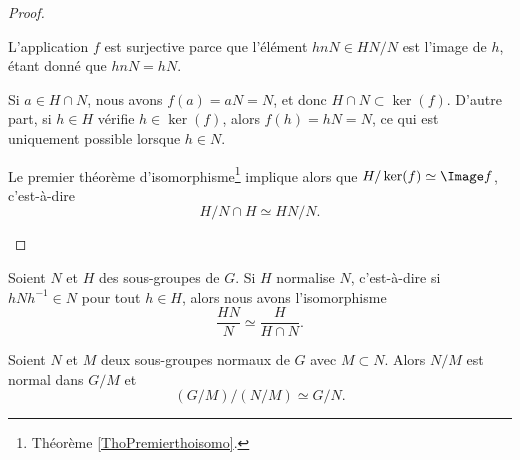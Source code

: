 \begin{proof}
\begin{enumerate}
		      \begin{subproof}
			      L'application \( f\) est surjective parce que l'élément \( hnN\in HN/N\) est l'image de \( h\), étant donné que \( hnN=hN\).

			      \spitem[\( \ker(f) = H\cap N\)]
			      Si \( a\in H\cap N\), nous avons \( f(a) =aN = N\), et donc \( H\cap N\subset \ker(f)\). D'autre part, si \( h\in H\) vérifie \( h\in\ker(f)\), alors \( f(h)=hN=N\), ce qui est uniquement possible lorsque \( h\in N\).

		      \end{subproof}
		      Le premier théorème d'isomorphisme\footnote{Théorème \ref{ThoPremierthoisomo}.} implique alors que \( H/\ker(f)\simeq \Image f\), c'est-à-dire
		      \begin{equation}
			      H/N\cap H\simeq HN/N.
		      \end{equation}
	\end{enumerate}
\end{proof}

\begin{proposition}     \label{PROPooVBGMooPTlyLF}
	Soient \( N\) et \( H\) des sous-groupes de \( G\). Si \( H\) normalise \( N\), c'est-à-dire si \( hNh^{-1}\in N\) pour tout \( h\in H\), alors nous avons l'isomorphisme
	\begin{equation}
		\frac{ HN }{ N }\simeq\frac{ H }{ H\cap N }.
	\end{equation}
\end{proposition}

\begin{theorem}  \label{ThoezgBep}
	Soient \( N\) et \( M\) deux sous-groupes normaux de \( G\) avec \( M\subset N\). Alors \( N/M\) est normal dans \( G/M\) et
	\begin{equation}
		(G/M)/(N/M)\simeq G/N.
	\end{equation}
\end{theorem}


